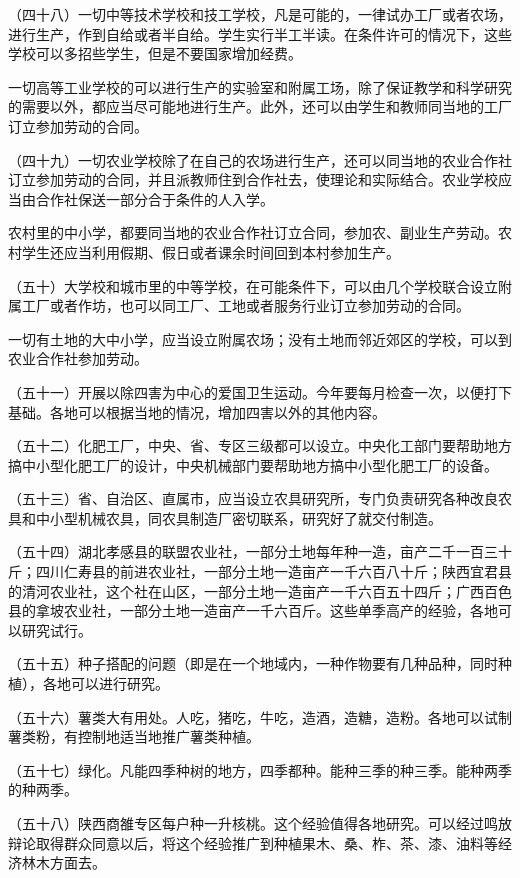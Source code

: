 （四十八）一切中等技术学校和技工学校，凡是可能的，一律试办工厂或者农场，进行生产，作到自给或者半自给。学生实行半工半读。在条件许可的情况下，这些学校可以多招些学生，但是不要国家增加经费。

一切高等工业学校的可以进行生产的实验室和附属工场，除了保证教学和科学研究的需要以外，都应当尽可能地进行生产。此外，还可以由学生和教师同当地的工厂订立参加劳动的合同。

（四十九）一切农业学校除了在自己的农场进行生产，还可以同当地的农业合作社订立参加劳动的合同，并且派教师住到合作社去，使理论和实际结合。农业学校应当由合作社保送一部分合于条件的人入学。

农村里的中小学，都要同当地的农业合作社订立合同，参加农、副业生产劳动。农村学生还应当利用假期、假日或者课余时间回到本村参加生产。

（五十）大学校和城市里的中等学校，在可能条件下，可以由几个学校联合设立附属工厂或者作坊，也可以同工厂、工地或者服务行业订立参加劳动的合同。

一切有土地的大中小学，应当设立附属农场；没有土地而邻近郊区的学校，可以到农业合作社参加劳动。

（五十一）开展以除四害为中心的爱国卫生运动。今年要每月检查一次，以便打下基础。各地可以根据当地的情况，增加四害以外的其他内容。

（五十二）化肥工厂，中央、省、专区三级都可以设立。中央化工部门要帮助地方搞中小型化肥工厂的设计，中央机械部门要帮助地方搞中小型化肥工厂的设备。

（五十三）省、自治区、直属市，应当设立农具研究所，专门负责研究各种改良农具和中小型机械农具，同农具制造厂密切联系，研究好了就交付制造。

（五十四）湖北孝感县的联盟农业社，一部分土地每年种一造，亩产二千一百三十斤；四川仁寿县的前进农业社，一部分土地一造亩产一千六百八十斤；陕西宜君县的清河农业社，这个社在山区，一部分土地一造亩产一千六百五十四斤；广西百色县的拿坡农业社，一部分土地一造亩产一千六百斤。这些单季高产的经验，各地可以研究试行。

（五十五）种子搭配的问题（即是在一个地域内，一种作物要有几种品种，同时种植），各地可以进行研究。

（五十六）薯类大有用处。人吃，猪吃，牛吃，造酒，造糖，造粉。各地可以试制薯类粉，有控制地适当地推广薯类种植。

（五十七）绿化。凡能四季种树的地方，四季都种。能种三季的种三季。能种两季的种两季。

（五十八）陕西商雒专区每户种一升核桃。这个经验值得各地研究。可以经过鸣放辩论取得群众同意以后，将这个经验推广到种植果木、桑、柞、茶、漆、油料等经济林木方面去。

